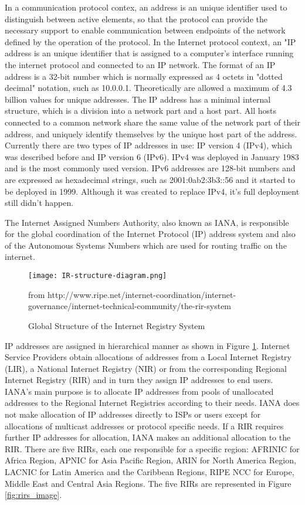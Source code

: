 \documentclass[11pt,a4paper]{scrreprt}
\begin{document}
In a communication protocol contex, an address is an unique identifier used to distinguish between active elements, so that the protocol can provide the necessary support to enable communication between endpoints of the network defined by the operation of the protocol. In the Internet protocol context, an "IP address is an unique identifier that is assigned to a computer's interface running the internet protocol and connected to an IP network. The format of an IP address is a 32-bit number which is normally expressed as 4 octets in "dotted decimal" notation, such as 10.0.0.1. Theoretically are allowed a maximum of 4.3 billion values for unique addresses. The IP address has a minimal internal structure, which is a division into a network part and a host part. All hosts connected to a common network share the same value of the network part of their address, and uniquely identify themselves by the unique host part of the address. Currently there are two types of IP addresses in use: IP version 4 (IPv4), which was described before and IP version 6 (IPv6). IPv4 was deployed in January 1983 and is the most commonly used version. IPv6 addresses are 128-bit numbers and are expressed as hexadecimal strings, such as 2001:0ab2:3b3::56 and it started to be deployed in 1999. Although it was created to replace IPv4, it's full deployment still didn't happen.


The Internet Assigned Numbers Authority, also known as IANA, is responsible for the global coordination of the Internet Protocol (IP) address system and also of the Autonomous Systems Numbers which are used for routing traffic on the internet.  

\begin{figure}[h!]
\centering
\texttt{[image: IR-structure-diagram.png]}
\caption{Global Structure of the Internet Registry System}
from http://www.ripe.net/internet-coordination/internet-governance/internet-technical-community/the-rir-system
\label{fig:ir_structure_diagram}
\end{figure}

IP addresses are assigned in hierarchical manner as shown in Figure \ref{fig:ir_structure_diagram}. Internet Service Providers obtain allocations of addresses from a Local Internet Registry (LIR), a National Internet Registry (NIR) or from the corresponding Regional Internet Registry (RIR) and in turn they assign IP addresses to end users. IANA's main purpose is to allocate IP addresses from pools of unallocated addresses to the Regional Internet Registries according to their needs. IANA does not make allocation of IP addresses directly to ISPs or users except for allocations of multicast addresses or protocol specific needs. If a RIR requires further IP addresses for allocation, IANA makes an additional allocation to the RIR. There are five RIRs, each one responsible for a specific region: AFRINIC for Africa Region, APNIC for Asia Pacific Region, ARIN for North America Region, LACNIC for Latin America and the Caribbean Regions, RIPE NCC for Europe, Middle East and Central Asia Regions. The five RIRs are represented in Figure \ref{fig:rirs_image}.
\end{document}
